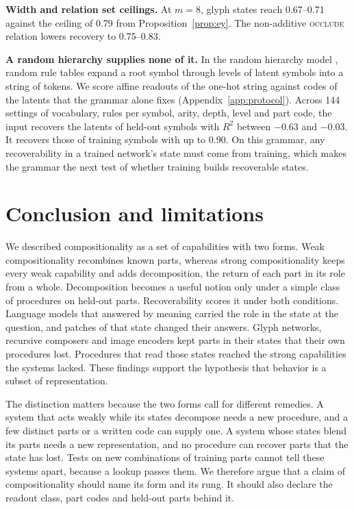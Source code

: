 \textbf{Width and relation set ceilings.} At $m = 8$, glyph states reach 0.67--0.71 against the ceiling of 0.79 from Proposition~\ref{prop:ey}. The non-additive \textsc{occlude} relation lowers recovery to 0.75--0.83.

\textbf{A random hierarchy supplies none of it.} In the random hierarchy model \citep{cagnetta2024rhm}, random rule tables expand a root symbol through levels of latent symbols into a string of tokens. We score affine readouts of the one-hot string against codes of the latents that the grammar alone fixes (Appendix~\ref{app:protocol}). Across 144 settings of vocabulary, rules per symbol, arity, depth, level and part code, the input recovers the latents of held-out symbols with $R^2$ between $-0.63$ and $-0.03$. It recovers those of training symbols with up to 0.90. On this grammar, any recoverability in a trained network's state must come from training, which makes the grammar the next test of whether training builds recoverable states.

\section{Conclusion and limitations}
\label{sec:discussion}

We described compositionality as a set of capabilities with two forms. Weak compositionality recombines known parts, whereas strong compositionality keeps every weak capability and adds decomposition, the return of each part in its role from a whole. Decomposition becomes a useful notion only under a simple class of procedures on held-out parts. Recoverability scores it under both conditions. Language models that answered by meaning carried the role in the state at the question, and patches of that state changed their answers. Glyph networks, recursive composers and image encoders kept parts in their states that their own procedures lost. Procedures that read those states reached the strong capabilities the systems lacked. These findings support the hypothesis that behavior is a subset of representation.

The distinction matters because the two forms call for different remedies. A system that acts weakly while its states decompose needs a new procedure, and a few distinct parts or a written code can supply one. A system whose states blend its parts needs a new representation, and no procedure can recover parts that the state has lost. Tests on new combinations of training parts cannot tell these systems apart, because a lookup passes them. We therefore argue that a claim of compositionality should name its form and its rung. It should also declare the readout class, part codes and held-out parts behind it.

